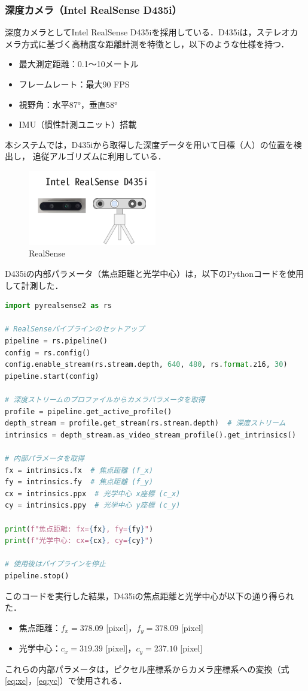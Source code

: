 \subsubsection{深度カメラ（Intel RealSense D435i）}
深度カメラとしてIntel RealSense D435iを採用している．D435iは，ステレオカメラ方式に基づく高精度な距離計測を特徴とし，以下のような仕様を持つ．
\begin{itemize}
    \item 最大測定距離：0.1～10メートル
    \item フレームレート：最大90 FPS
    \item 視野角：水平87°，垂直58°
    \item IMU（慣性計測ユニット）搭載
\end{itemize}
本システムでは，D435iから取得した深度データを用いて目標（人）の位置を検出し，
追従アルゴリズムに利用している．

\begin{figure}[H]
    \centering
    \includegraphics[width=0.5\textwidth]{figure/RealSense.pdf}
    \caption{RealSense}
    \label{fig:RealSense}
\end{figure}

D435iの内部パラメータ（焦点距離と光学中心）は，以下のPythonコードを使用して計測した．

\begin{lstlisting}[language=Python, caption=RealSense内部パラメータの取得]
import pyrealsense2 as rs

# RealSenseパイプラインのセットアップ
pipeline = rs.pipeline()
config = rs.config()
config.enable_stream(rs.stream.depth, 640, 480, rs.format.z16, 30)
pipeline.start(config)

# 深度ストリームのプロファイルからカメラパラメータを取得
profile = pipeline.get_active_profile()
depth_stream = profile.get_stream(rs.stream.depth)  # 深度ストリーム
intrinsics = depth_stream.as_video_stream_profile().get_intrinsics()

# 内部パラメータを取得
fx = intrinsics.fx  # 焦点距離 (f_x)
fy = intrinsics.fy  # 焦点距離 (f_y)
cx = intrinsics.ppx  # 光学中心 x座標 (c_x)
cy = intrinsics.ppy  # 光学中心 y座標 (c_y)

print(f"焦点距離: fx={fx}, fy={fy}")
print(f"光学中心: cx={cx}, cy={cy}")

# 使用後はパイプラインを停止
pipeline.stop()
\end{lstlisting}

このコードを実行した結果，D435iの焦点距離と光学中心が以下の通り得られた．

\begin{itemize}
    \item 焦点距離：$f_x = 378.09$ [pixel]，$f_y = 378.09$ [pixel]
    \item 光学中心：$c_x = 319.39$ [pixel]，$c_y = 237.10$ [pixel]
\end{itemize}

これらの内部パラメータは，ピクセル座標系からカメラ座標系への変換（式\eqref{eq:xc}，\eqref{eq:yc}）で使用される．